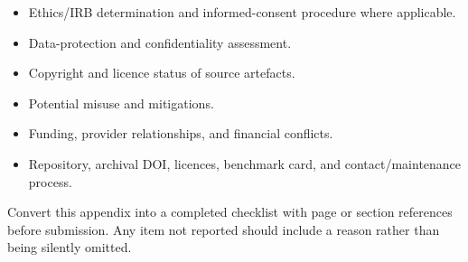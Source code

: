 \begin{itemize}
    \item Ethics/IRB determination and informed-consent procedure where applicable.
    \item Data-protection and confidentiality assessment.
    \item Copyright and licence status of source artefacts.
    \item Potential misuse and mitigations.
    \item Funding, provider relationships, and financial conflicts.
    \item Repository, archival DOI, licences, benchmark card, and contact/maintenance process.
\end{itemize}

\begin{placeholderblock}
Convert this appendix into a completed checklist with page or section references before submission. Any item not reported should include a reason rather than being silently omitted.
\end{placeholderblock}
